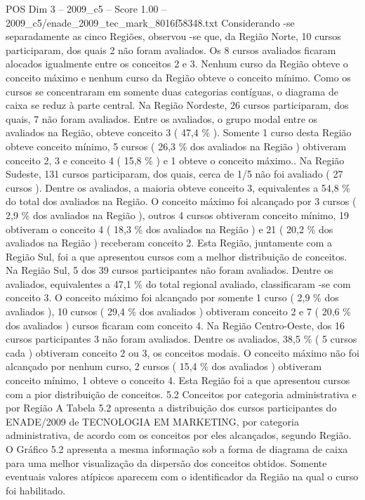 \begin{textsample}{POS Dim 3 – 2009\_c5 – Score 1.00 – 2009\_c5/enade\_2009\_tec\_mark\_8016f58348.txt}
Considerando -se separadamente as cinco Regiões, observou -se que, da Região Norte, 10 cursos participaram, dos quais 2 não foram avaliados.
Os 8 cursos avaliados ficaram alocados igualmente entre os conceitos 2 e 3.
Nenhum curso da Região obteve o conceito máximo e nenhum curso da Região obteve o conceito mínimo.
Como os cursos se concentraram em somente duas categorias contíguas, o diagrama de caixa se reduz à parte central.
Na Região Nordeste, 26 cursos participaram, dos quais, 7 não foram avaliados.
Entre os avaliados, o grupo modal entre os avaliados na Região, obteve conceito 3 ( 47,4 \% ).
Somente 1 curso desta Região obteve conceito mínimo, 5 cursos ( 26,3 \% dos avaliados na Região ) obtiveram conceito 2, 3 e conceito 4 ( 15,8 \% ) e 1 obteve o conceito máximo..
Na Região Sudeste, 131 cursos participaram, dos quais, cerca de 1/5 não foi avaliado ( 27 cursos ).
Dentre os avaliados, a maioria obteve conceito 3, equivalentes a 54,8 \% do total dos avaliados na Região.
O conceito máximo foi alcançado por 3 cursos ( 2,9 \% dos avaliados na Região ), outros 4 cursos obtiveram conceito mínimo, 19 obtiveram o conceito 4 ( 18,3 \% dos avaliados na Região ) e 21 ( 20,2 \% dos avaliados na Região ) receberam conceito 2.
Esta Região, juntamente com a Região Sul, foi a que apresentou cursos com a melhor distribuição de conceitos.
Na Região Sul, 5 dos 39 cursos participantes não foram avaliados.
Dentre os avaliados, equivalentes a 47,1 \% do total regional avaliado, classificaram -se com conceito 3.
O conceito máximo foi alcançado por somente 1 curso ( 2,9 \% dos avaliados ), 10 cursos ( 29,4 \% dos avaliados ) obtiveram conceito 2 e 7 ( 20,6 \% dos avaliados ) cursos ficaram com conceito 4.
Na Região Centro-Oeste, dos 16 cursos participantes 3 não foram avaliados.
Dentre os avaliados, 38,5 \% ( 5 cursos cada ) obtiveram conceito 2 ou 3, os conceitos modais.
O conceito máximo não foi alcançado por nenhum curso, 2 cursos ( 15,4 \% dos avaliados ) obtiveram conceito mínimo, 1 obteve o conceito 4.
Esta Região foi a que apresentou cursos com a pior distribuição de conceitos. 5.2 Conceitos por categoria administrativa e por Região A Tabela 5.2 apresenta a distribuição dos cursos participantes do ENADE/2009 de TECNOLOGIA EM MARKETING, por categoria administrativa, de acordo com os conceitos por eles alcançados, segundo Região.
O Gráfico 5.2 apresenta a mesma informação sob a forma de diagrama de caixa para uma melhor visualização da dispersão dos conceitos obtidos.
Somente eventuais valores atípicos aparecem com o identificador da Região na qual o curso foi habilitado.

\end{textsample}
